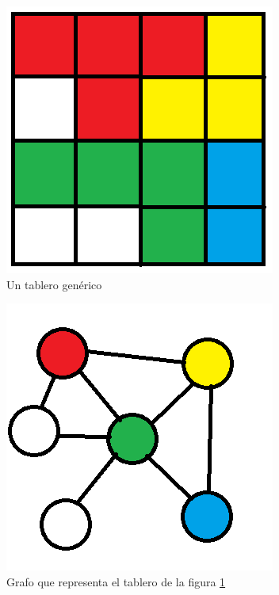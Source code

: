 \documentclass{article}
\begin{document}
\begin{figure}[h!]
  \caption{Un tablero gen\'erico}
  \label{mapa}
  \centering
    \includegraphics[scale=0.88]{boardToGraph.png}
\end{figure}

\begin{figure}[h!]
  \caption{Grafo que representa el tablero de la figura \ref{mapa}}
  \label{grafo}
  \centering
    \includegraphics[scale=0.88]{graph.png}
\end{figure}
\end{document}
